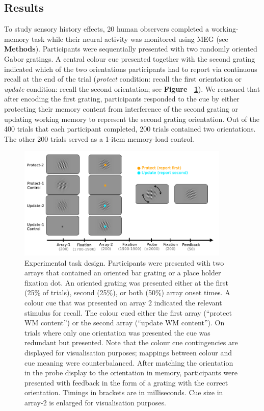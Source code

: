 \documentclass{article}
\begin{document}
\begin{large}
\section{Results}
%
To study sensory history effects, 20 human observers completed a working-memory task while their neural activity was monitored using MEG (see \textbf{Methods}). Participants were sequentially presented with two randomly oriented Gabor gratings. A central colour cue presented together with the second grating indicated which of the two orientations participants had to report via continuous recall at the end of the trial (\textit{protect} condition: recall the first orientation or \textit{update} condition: recall the second orientation; see \textbf{Figure ~\ref{fig:task_design}}). We reasoned that after encoding the first grating, participants responded to the cue by either protecting their memory content from interference of the second grating or updating working memory to represent the second grating orientation. Out of the 400 trials that each participant completed, 200 trials contained two orientations. The other 200 trials served as a 1-item memory-load control.


\begin{figure}[H]
\centering\includegraphics[width=0.9\textwidth]{figures/task_design.png} 
\caption[Experimental task design.]{Experimental task design. Participants were presented with two arrays that contained an oriented bar grating or a place holder fixation dot. An oriented grating was presented either at the first (25\% of trials), second (25\%), or both (50\%) array onset times. A colour cue that was presented on array 2 indicated the relevant stimulus for recall. The colour cued either the first array (“protect WM content”) or the second array (“update WM content”). On trials where only one orientation was presented the cue was redundant but presented. Note that the colour cue contingencies are displayed for visualisation purposes; mappings between colour and cue meaning were counterbalanced. After matching the orientation in the probe display to the orientation in memory, participants were presented with feedback in the form of a grating with the correct orientation. Timings in brackets are in milliseconds. Cue size in array-2 is enlarged for visualisation purposes.}
\label{fig:task_design}
\end{figure}



\end{large}
\end{document}
